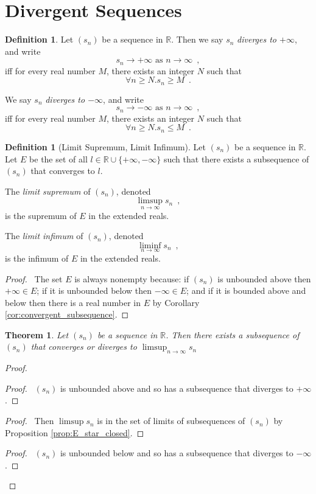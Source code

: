 \documentclass{book}
\let\qed\relax
\newtheorem{thm}[prop]{Theorem}
\theoremstyle{definition}
\newtheorem{df}[prop]{Definition}
\begin{document}
\section{Divergent Sequences}

\begin{df}
Let $(s_n)$ be a sequence in $\mathbb{R}$. Then we say $s_n$ \emph{diverges to $+\infty$}, and write
\[ s_n \rightarrow + \infty \text{ as } n \rightarrow \infty \enspace , \]
iff for every real number $M$, there exists an integer $N$ such that
\[ \forall n \geq N. s_n \geq M \enspace . \]

We say $s_n$ \emph{diverges to $-\infty$}, and write
\[ s_n \rightarrow - \infty \text{ as } n \rightarrow \infty \enspace , \]
iff for every real number $M$, there exists an integer $N$ such that
\[ \forall n \geq N. s_n \leq M \enspace . \]
\end{df}

\begin{df}[Limit Supremum, Limit Infimum]
Let $(s_n)$ be a sequence in $\mathbb{R}$. Let $E$ be the set of all $l \in \mathbb{R} \cup \{ + \infty, - \infty \}$ such that there exists a subsequence of $(s_n)$ that converges to $l$.

The \emph{limit supremum} of $(s_n)$, denoted
\[ \limsup_{n \rightarrow \infty} s_n \enspace , \]
is the supremum of $E$ in the extended reals.

The \emph{limit infimum} of $(s_n)$, denoted
\[ \liminf_{n \rightarrow \infty} s_n \enspace , \]
is the infimum of $E$ in the extended reals.
\end{df}

\begin{proof}
\pf\ The set $E$ is always nonempty because: if $(s_n)$ is unbounded above then $+ \infty \in E$; if it is unbounded below then $- \infty \in E$; and if it is bounded above and below then there is a real number in $E$ by Corollary \ref{cor:convergent_subsequence}. \qed
\end{proof}

\begin{thm}
\label{thm:limsup_is_subsequential_limit}
Let $(s_n)$ be a sequence in $\mathbb{R}$. Then there exists a subsequence of $(s_n)$ that converges or diverges to $\limsup_{n \rightarrow \infty} s_n$
\end{thm}

\begin{proof}
\pf
{}
\begin{proof}
	\pf\ $(s_n)$ is unbounded above and so has a subsequence that diverges to $+ \infty$.
\end{proof}
\begin{proof}
	\pf\ Then $\limsup s_n$ is in the set of limits of subsequences of $(s_n)$ by Proposition \ref{prop:E_star_closed}.
\end{proof}
\begin{proof}
	\pf\ $(s_n)$ is unbounded below and so has a subsequence that diverges to $- \infty$.
\end{proof}
\qed
\end{proof}
\end{document}
